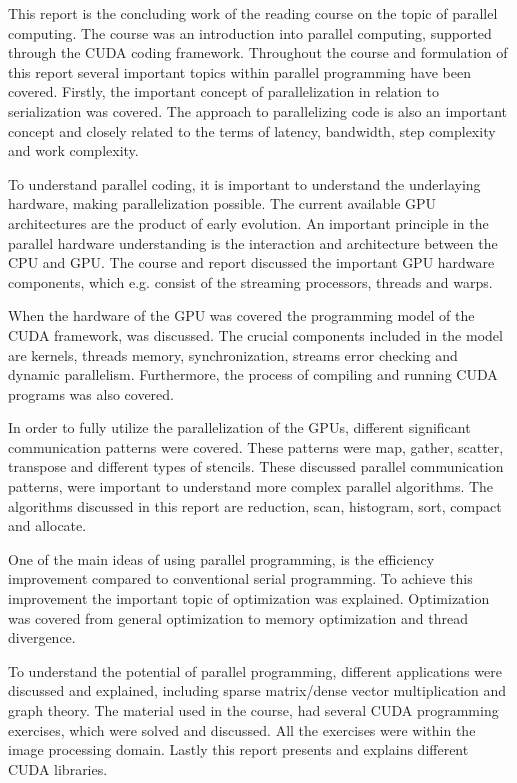This report is the concluding work of the reading course on the topic of parallel computing. 
The course was an introduction into parallel computing, supported through the CUDA coding framework. 
Throughout the course and formulation of this report several important topics within parallel programming have been covered. 
Firstly, the important concept of parallelization in relation to serialization was covered. 
The approach to parallelizing code is also an important concept and closely related to the terms of latency, bandwidth, step complexity and work complexity.

To understand parallel coding, it is important to understand the underlaying hardware, making parallelization possible. 
The current available GPU architectures are the product of early evolution. 
An important principle in the parallel hardware understanding is the interaction and architecture between the CPU and GPU. 
The course and report discussed the important GPU hardware components, which e.g. consist of the streaming processors, threads and warps. 

When the hardware of the GPU was covered the programming model of the CUDA framework, was discussed. The crucial components included in the model are kernels, threads memory, synchronization, streams error checking and dynamic parallelism. 
Furthermore, the process of compiling and running CUDA programs was also covered.

In order to fully utilize the parallelization of the GPUs, different significant communication patterns were covered. These patterns were map, gather, scatter, transpose and different types of stencils. These discussed parallel communication patterns, were important to understand more complex parallel algorithms. The algorithms discussed in this report are reduction, scan, histogram, sort, compact and allocate. 

One of the main ideas of using parallel programming, is the efficiency improvement compared to conventional serial programming. To achieve this improvement the important topic of optimization was explained. Optimization was covered from general optimization to memory optimization and thread divergence. 

To understand the potential of parallel programming, different applications were discussed and explained, including sparse matrix/dense vector multiplication and graph theory. The material used in the course, had several CUDA programming exercises, which were solved and discussed. All the exercises were within the image processing domain. Lastly this report presents and explains different CUDA libraries. 